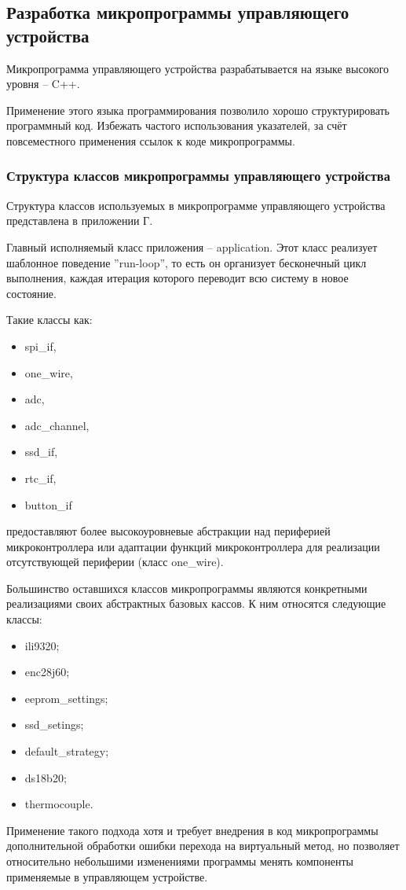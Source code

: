 \subsection{Разработка микропрограммы управляющего устройства}
Микропрограмма управляющего устройства разрабатывается на языке высокого уровня -- C++.

Применение этого языка программирования позволило хорошо структурировать программный код.
Избежать частого использования указателей, за счёт повсеместного применения ссылок к коде
микропрограммы.


\subsubsection{Структура классов микропрограммы управляющего устройства}
Структура классов используемых в микропрограмме управляющего устройства представлена в
приложении Г.

Главный исполняемый класс приложения -- application. Этот класс реализует шаблонное поведение
''run-loop'', то есть он организует бесконечный цикл выполнения, каждая итерация которого переводит
всю систему в новое состояние.

Такие классы как:
\begin{itemize}
	\item spi\_if,
	\item one\_wire,
	\item adc,
	\item adc\_channel,
	\item ssd\_if,
	\item rtc\_if,
	\item button\_if
\end{itemize}
предоставляют более высокоуровневые абстракции над периферией микроконтроллера или адаптации
функций микроконтроллера для реализации отсутствующей периферии (класс one\_wire).

Большинство оставшихся классов микропрограммы являются конкретными реализациями своих
абстрактных базовых кассов. К ним относятся следующие классы:
\begin{itemize}
	\item ili9320;
	\item enc28j60;
	\item eeprom\_settings;
	\item ssd\_setings;
	\item default\_strategy;
	\item ds18b20;
	\item thermocouple.
\end{itemize}
Применение такого подхода хотя и требует внедрения в код микропрограммы дополнительной
обработки ошибки перехода на виртуальный метод, но позволяет относительно
небольшими изменениями программы менять компоненты применяемые в управляющем устройстве.

